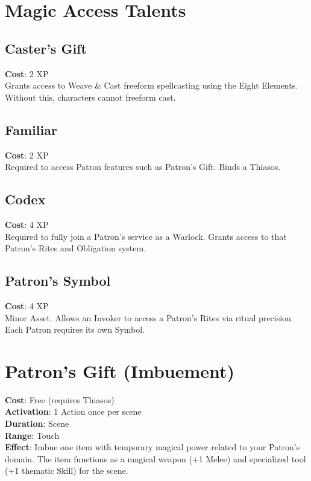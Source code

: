 \section{Magic Access Talents}

\subsection*{Caster's Gift}
\textbf{Cost}: 2 XP \\
Grants access to Weave \& Cast freeform spellcasting using the Eight Elements. Without this, characters cannot freeform cast.

\subsection*{Familiar}
\textbf{Cost}: 2 XP \\
Required to access Patron features such as Patron's Gift. Binds a Thiasos.

\subsection*{Codex}
\textbf{Cost}: 4 XP \\
Required to fully join a Patron's service as a Warlock. Grants access to that Patron's Rites and Obligation system.

\subsection*{Patron's Symbol}
\textbf{Cost}: 4 XP \\
Minor Asset. Allows an Invoker to access a Patron's Rites via ritual precision. Each Patron requires its own Symbol.

\section{Patron's Gift (Imbuement)}

\textbf{Cost}: Free (requires Thiasos) \\
\textbf{Activation}: 1 Action once per scene \\
\textbf{Duration}: Scene \\
\textbf{Range}: Touch \\
\textbf{Effect}: Imbue one item with temporary magical power related to your Patron's domain. The item functions as a magical weapon (+1 Melee) and specialized tool (+1 thematic Skill) for the scene.

